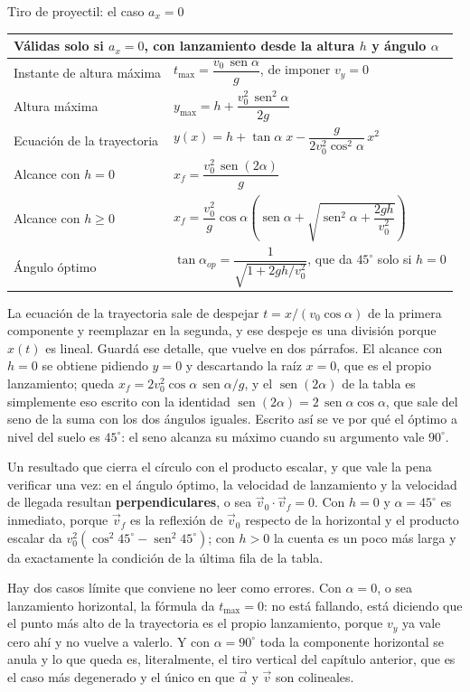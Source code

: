 \documentclass[11pt,openany]{book}
\newcommand{\sen}{\operatorname{sen}}
\begin{document}
\begin{bloque}{Tiro de proyectil: el caso $a_x = 0$}
\begin{center}
\begin{tabular}{ll}
\toprule
\multicolumn{2}{l}{\footnotesize Válidas solo si $a_x = 0$, con lanzamiento desde la altura $h$ y ángulo $\alpha$} \\
\midrule
Instante de altura máxima & $t_{\max} = \dfrac{v_0\,\sen\alpha}{g}$, de imponer $v_y = 0$ \\[7pt]
Altura máxima & $y_{\max} = h + \dfrac{v_0^2\,\sen^2\alpha}{2g}$ \\[7pt]
Ecuación de la trayectoria & $y(x) = h + \tan\alpha\;x - \dfrac{g}{2v_0^2\cos^2\alpha}\,x^2$ \\[7pt]
Alcance con $h = 0$ & $x_f = \dfrac{v_0^2\,\sen(2\alpha)}{g}$ \\[7pt]
Alcance con $h \geq 0$ & $x_f = \dfrac{v_0^2}{g}\cos\alpha\left(\sen\alpha + \sqrt{\sen^2\alpha + \dfrac{2gh}{v_0^2}}\right)$ \\[9pt]
Ángulo óptimo & $\tan\alpha_{op} = \dfrac{1}{\sqrt{1 + 2gh/v_0^2}}$, que da $45^\circ$ solo si $h = 0$ \\
\bottomrule
\end{tabular}
\end{center}

La ecuación de la trayectoria sale de despejar $t = x/(v_0\cos\alpha)$ de la primera componente y reemplazar en la segunda, y ese despeje es una división porque $x(t)$ es lineal. Guardá ese detalle, que vuelve en dos párrafos. El alcance con $h = 0$ se obtiene pidiendo $y = 0$ y descartando la raíz $x = 0$, que es el propio lanzamiento; queda $x_f = 2v_0^2\cos\alpha\,\sen\alpha/g$, y el $\sen(2\alpha)$ de la tabla es simplemente eso escrito con la identidad $\sen(2\alpha) = 2\,\sen\alpha\cos\alpha$, que sale del seno de la suma con los dos ángulos iguales. Escrito así se ve por qué el óptimo a nivel del suelo es $45^\circ$: el seno alcanza su máximo cuando su argumento vale $90^\circ$.

Un resultado que cierra el círculo con el producto escalar, y que vale la pena verificar una vez: en el ángulo óptimo, la velocidad de lanzamiento y la velocidad de llegada resultan \textbf{perpendiculares}, o sea $\vec v_0\cdot\vec v_f = 0$. Con $h = 0$ y $\alpha = 45^\circ$ es inmediato, porque $\vec v_f$ es la reflexión de $\vec v_0$ respecto de la horizontal y el producto escalar da $v_0^2(\cos^2 45^\circ - \sen^2 45^\circ)$; con $h > 0$ la cuenta es un poco más larga y da exactamente la condición de la última fila de la tabla.

Hay dos casos límite que conviene no leer como errores. Con $\alpha = 0$, o sea lanzamiento horizontal, la fórmula da $t_{\max} = 0$: no está fallando, está diciendo que el punto más alto de la trayectoria es el propio lanzamiento, porque $v_y$ ya vale cero ahí y no vuelve a valerlo. Y con $\alpha = 90^\circ$ toda la componente horizontal se anula y lo que queda es, literalmente, el tiro vertical del capítulo anterior, que es el caso más degenerado y el único en que $\vec a$ y $\vec v$ son colineales.


\end{bloque}
\end{document}
